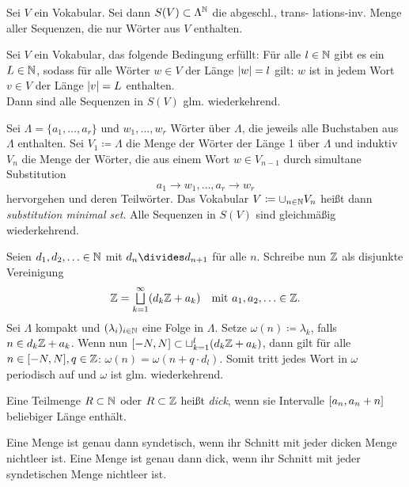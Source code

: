 \documentclass{cheat-sheet}
\begin{document}
\begin{defn}
  Sei $V$ ein Vokabular. Sei dann $S(V) \subset \Lambda^{\mathbb{N}}$ die abgeschl., trans- lations-inv. Menge aller Sequenzen, die nur Wörter aus $V$ enthalten.
\end{defn}

\begin{lem}
  Sei $V$ ein Vokabular, das folgende Bedingung erfüllt: Für alle $l \in \mathbb{N}$ gibt es ein $L \in \mathbb{N}$, sodass für alle Wörter $w \in V$ der Länge $\lvert w\rvert = l$ gilt: $w$ ist in jedem Wort $v \in V$ der Länge $\lvert v\rvert = L$ enthalten. \\
  Dann sind alle Sequenzen in $S(V)$ glm. wiederkehrend.
\end{lem}

\begin{bem}
  Sei $\Lambda = \{ a_1, \ldots, a_r \}$ und $w_1, \ldots, w_r$ Wörter über $\Lambda$, die jeweils alle Buchstaben aus $\Lambda$ enthalten. Sei $V_1 \coloneqq \Lambda$ die Menge der Wörter der Länge 1 über $\Lambda$ und induktiv $V_n$ die Menge der Wörter, die aus einem Wort $w \in V_{n-1}$ durch simultane Substitution
  \[ a_1 \to w_1, \ldots, a_r \to w_r \]
  hervorgehen und deren Teilwörter. Das Vokabular $V \coloneqq \cup_{n \in \mathbb{N}} V_n$ heißt dann \emph{substitution minimal set}. Alle Sequenzen in $S(V)$ sind gleichmäßig wiederkehrend.
\end{bem}

\begin{bem}
  Seien $d_1, d_2, \ldots \in \mathbb{N}$ mit $d_n \divides d_{n+1}$ für alle $n$.
  Schreibe nun $\mathbb{Z}$ als disjunkte Vereinigung
  \[
    \Z = \bigsqcup_{k=1}^\infty (d_k \Z + a_k) \quad
    \text{mit $a_1, a_2, \ldots \in \Z$.}
  \]
  Sei $\Lambda$ kompakt und $(\lambda_i)_{i \in \mathbb{N}}$ eine Folge in $\Lambda$. Setze
  $\omega(n) \coloneqq \lambda_k$, falls $n \in d_k \mathbb{Z} + a_k$.
  Wenn nun $[-N, N] \subset \sqcup_{k=1}^l (d_k \mathbb{Z} + a_k)$, dann gilt für alle $n \in [-N, N], q \in \mathbb{Z}$: $\omega(n) = \omega(n + q \cdot d_l)$. Somit tritt jedes Wort in $\omega$ periodisch auf und $\omega$ ist glm. wiederkehrend.
\end{bem}


\begin{defn}
  Eine Teilmenge $R \subset \mathbb{N}$ oder $R \subset \mathbb{Z}$ heißt \emph{dick}, wenn sie Intervalle $\left[ a_n, a_n + n \right]$ beliebiger Länge enthält.
\end{defn}

\begin{bem}
  Eine Menge ist genau dann syndetisch, wenn ihr Schnitt mit jeder dicken Menge nichtleer ist.
  Eine Menge ist genau dann dick, wenn ihr Schnitt mit jeder syndetischen Menge nichtleer ist.
\end{bem}
\end{document}
